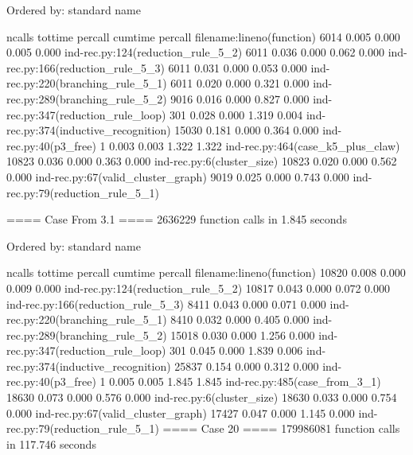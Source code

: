 \documentclass[11pt]{article}
\begin{document}
             Ordered by: standard name

             ncalls  tottime  percall  cumtime  percall filename:lineno(function)
               6014    0.005    0.000    0.005    0.000 ind-rec.py:124(reduction_rule_5_2)
               6011    0.036    0.000    0.062    0.000 ind-rec.py:166(reduction_rule_5_3)
               6011    0.031    0.000    0.053    0.000 ind-rec.py:220(branching_rule_5_1)
               6011    0.020    0.000    0.321    0.000 ind-rec.py:289(branching_rule_5_2)
               9016    0.016    0.000    0.827    0.000 ind-rec.py:347(reduction_rule_loop)
                301    0.028    0.000    1.319    0.004 ind-rec.py:374(inductive_recognition)
              15030    0.181    0.000    0.364    0.000 ind-rec.py:40(p3_free)
                  1    0.003    0.003    1.322    1.322 ind-rec.py:464(case_k5_plus_claw)
              10823    0.036    0.000    0.363    0.000 ind-rec.py:6(cluster_size)
              10823    0.020    0.000    0.562    0.000 ind-rec.py:67(valid_cluster_graph)
               9019    0.025    0.000    0.743    0.000 ind-rec.py:79(reduction_rule_5_1)

               ==== Case From 3.1 ====
                        2636229 function calls in 1.845 seconds

                  Ordered by: standard name

                  ncalls  tottime  percall  cumtime  percall filename:lineno(function)
                   10820    0.008    0.000    0.009    0.000 ind-rec.py:124(reduction_rule_5_2)
                   10817    0.043    0.000    0.072    0.000 ind-rec.py:166(reduction_rule_5_3)
                    8411    0.043    0.000    0.071    0.000 ind-rec.py:220(branching_rule_5_1)
                    8410    0.032    0.000    0.405    0.000 ind-rec.py:289(branching_rule_5_2)
                   15018    0.030    0.000    1.256    0.000 ind-rec.py:347(reduction_rule_loop)
                     301    0.045    0.000    1.839    0.006 ind-rec.py:374(inductive_recognition)
                   25837    0.154    0.000    0.312    0.000 ind-rec.py:40(p3_free)
                       1    0.005    0.005    1.845    1.845 ind-rec.py:485(case_from_3_1)
                   18630    0.073    0.000    0.576    0.000 ind-rec.py:6(cluster_size)
                   18630    0.033    0.000    0.754    0.000 ind-rec.py:67(valid_cluster_graph)
                   17427    0.047    0.000    1.145    0.000 ind-rec.py:79(reduction_rule_5_1)
                   ==== Case 20 ====
                            179986081 function calls in 117.746 seconds
\end{document}
